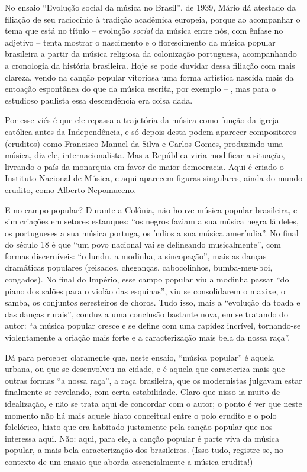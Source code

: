 No ensaio ``Evolução social da música no Brasil'', de 1939, Mário dá
atestado da filiação de seu raciocínio à tradição acadêmica europeia,
porque ao acompanhar o tema que está no título -- evolução \emph{social}
da música entre nós, com ênfase no adjetivo -- tenta mostrar o
nascimento e o florescimento da música popular brasileira a partir da
música religiosa da colonização portuguesa, acompanhando a cronologia da
história brasileira. Hoje se pode duvidar dessa filiação com mais
clareza, vendo na canção popular vitoriosa uma forma artística nascida
mais da entoação espontânea do que da música escrita, por exemplo -- ,
mas para o estudioso paulista essa descendência era coisa dada.

Por esse viés é que ele repassa a trajetória da música como função da
igreja católica antes da Independência, e só depois desta podem aparecer
compositores (eruditos) como Francisco Manuel da Silva e Carlos Gomes,
produzindo uma música, diz ele, internacionalista. Mas a República viria
modificar a situação, livrando o país da monarquia em favor de maior
democracia. Aqui é criado o Instituto Nacional de Música, e aqui
aparecem figuras singulares, ainda do mundo erudito, como Alberto
Nepomuceno.

E no campo popular? Durante a Colônia, não houve música popular
brasileira, e sim criações em setores estanques: ``os negros faziam a
sua música negra lá deles, os portugueses a sua música portuga, os
índios a sua música ameríndia''. No final do século 18 é que ``um povo
nacional vai se delineando musicalmente'', com formas discerníveis: ``o
lundu, a modinha, a sincopação'', mais as danças dramáticas populares
(reisados, cheganças, cabocolinhos, bumba-meu-boi, congados). No final
do Império, esse campo popular viu a modinha passar ``do piano dos
salões para o violão das esquinas'', viu se consolidarem o maxixe, o
samba, os conjuntos seresteiros de choros. Tudo isso, mais a ``evolução
da toada e das danças rurais'', conduz a uma conclusão bastante nova, em
se tratando do autor: ``a música popular cresce e se define com uma
rapidez incrível, tornando-se violentamente a criação mais forte e a
caracterização mais bela da nossa raça''.

Dá para perceber claramente que, neste ensaio, ``música popular'' é
aquela urbana, ou que se desenvolveu na cidade, e é aquela que
caracteriza mais que outras formas ``a nossa raça'', a raça brasileira,
que os modernistas julgavam estar finalmente se revelando, com certa
estabilidade. Claro que nisso ia muito de idealização, e não se trata
aqui de concordar com o autor; o ponto é ver que neste momento não há
mais aquele hiato conceitual entre o polo erudito e o polo folclórico,
hiato que era habitado justamente pela canção popular que nos interessa
aqui. Não: aqui, para ele, a canção popular é parte viva da música
popular, a mais bela caracterização dos brasileiros. (Isso tudo,
registre-se, no contexto de um ensaio que aborda essencialmente a música
erudita!)

